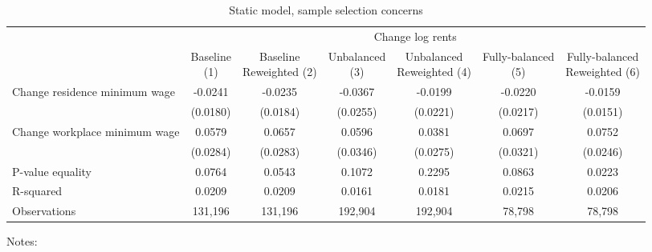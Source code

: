 \begin{table}
    \caption{Static model, sample selection concerns}
    \label{tab:static_sample}

    \begin{tabular}{@{}lcccccc@{}}
        \toprule
                                             & \multicolumn{6}{c}{Change log rents}                                     \\ \cmidrule(l){2-7} 
                                             & \shortstack{Baseline\\(1)}       & \shortstack{Baseline\\Reweighted (2)}
                                             & \shortstack{Unbalanced\\(3)}     & \shortstack{Unbalanced\\Reweighted (4)}
                                             & \shortstack{Fully-balanced\\(5)} & \shortstack{Fully-balanced\\Reweighted (6)}  \\ \midrule
        Change residence minimum wage        & -0.0241      & -0.0235        & -0.0367       & -0.0199      & -0.0220     & -0.0159            \\
                                             & (0.0180)    & (0.0184)      & (0.0255)     & (0.0221)    & (0.0217)   & (0.0151)          \\
        Change workplace minimum wage        & 0.0579      & 0.0657        & 0.0596       & 0.0381      & 0.0697     & 0.0752            \\
                                             & (0.0284)    & (0.0283)      & (0.0346)     & (0.0275)    & (0.0321)   & (0.0246)          \\ \midrule
        P-value equality                     & 0.0764      & 0.0543        & 0.1072       & 0.2295      & 0.0863     & 0.0223            \\
        R-squared                            & 0.0209      & 0.0209        & 0.0161       & 0.0181      & 0.0215     & 0.0206            \\
        Observations                         & 131,196     & 131,196       & 192,904      & 192,904     & 78,798    & 78,798           \\ \bottomrule
    \end{tabular}

    \begin{minipage}{.95\textwidth} \footnotesize
        \vspace{2mm}
        Notes: 
    \end{minipage}
\end{table}

